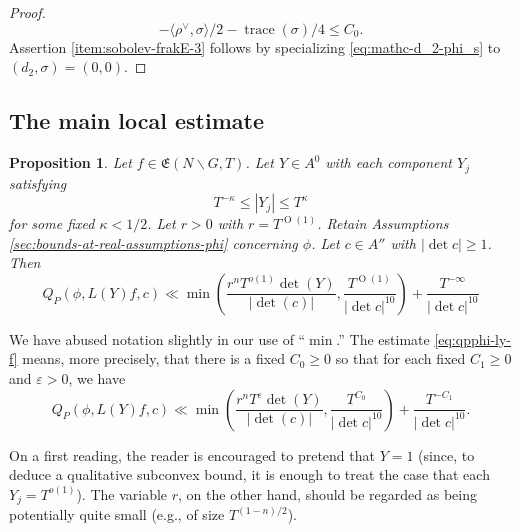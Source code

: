 \documentclass[reqno]{amsart}
\def\eps{\varepsilon}
\DeclareMathOperator{\trace}{trace}
\def\O{\operatorname{O}}
\theoremstyle{plain} \newtheorem{theorem} {Theorem}
\newtheorem{proposition} [theorem] {Proposition}
\theoremstyle{definition} \newtheorem{definition} [theorem] {Definition}
\theoremstyle{itplain} %
\numberwithin{equation}{section}
\numberwithin{theorem}{section}
\renewcommand{\geq}{\geqslant}
\renewcommand{\leq}{\leqslant}
\begin{document}
\begin{proof}
  \begin{equation*}
    - \langle \rho ^\vee , \sigma  \rangle / 2 - \trace(\sigma)/4 \leq C_0.
  \end{equation*}
  Assertion \eqref{item:sobolev-frakE-3} follows by specializing \eqref{eq:mathc-d_2-phi_s} to $(d_2,\sigma) = (0,0)$.
\end{proof}


\subsection{The main local estimate}\label{sec:20230514074956}

\begin{proposition}\label{prop:sub-gln:let-f-in}
  Let $f \in \mathfrak{E}(N \backslash G, T)$.  Let $Y \in A^0$ with each component $Y_j$ satisfying
  \begin{equation}\label{eq:t-kappa-leq}
    T^{-\kappa} \leq |Y_j| \leq T^{\kappa}
  \end{equation}
  for some fixed $\kappa < 1/2$.  Let $r > 0$ with $r = T^{\O(1)}$.  Retain Assumptions \ref{sec:bounds-at-real-assumptions-phi} concerning $\phi$.  Let $c \in A''$ with $|\det c| \geq 1$.  Then
  \begin{equation}\label{eq:qpphi-ly-f}
    Q_P(\phi, L(Y) f, c)
    \ll
    \min
    \left(
      \frac{r^n T^{o(1)} \det(Y)}{|\det (c)|} ,
      \frac{T^{\O(1)}}{|\det c|^{10}} 
    \right)
    +
    \frac{T^{-\infty }}{|\det c|^{10}} 
  \end{equation}
\end{proposition}
We have abused notation slightly in our use of ``$\min$.''  The estimate \eqref{eq:qpphi-ly-f} means, more precisely, that there is a fixed $C_0 \geq 0$ so that for each fixed $C_1 \geq 0$ and $\eps > 0$, we have
\begin{equation*}
  Q_P(\phi, L(Y) f, c)
  \ll
  \min
  \left(
    \frac{r^n T^{\eps} \det(Y)}{|\det (c)|},
    \frac{T^{C_0}}{|\det c|^{10}} 
  \right)
  +
  \frac{T^{-C_1 }}{|\det c|^{10}}.
\end{equation*}

On a first reading, the reader is encouraged to pretend that $Y = 1$ (since, to deduce a qualitative subconvex bound, it is enough to treat the case that each $Y_j = T^{o(1)}$).  The variable $r$, on the other hand, should be regarded as being potentially quite small (e.g., of size $T^{(1-n)/2}$).
\end{document}
